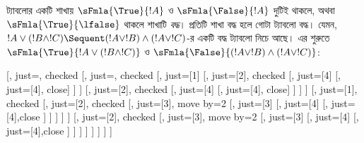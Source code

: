 \documentclass[../../../include/open-logic-section]{subfiles}
\begin{document}
ট্যাবলোর একটি শাখায় $\sFmla{\True}{!A}$ ও
$\sFmla{\False}{!A}$ দুটিই থাকলে, অথবা $\sFmla{\True}{\lfalse}$
থাকলে শাখাটি \emph{বদ্ধ}। প্রতিটি শাখা বদ্ধ হলে গোটা ট্যাবলো
বদ্ধ। যেমন,
$!A \lor (!B \land !C) \Sequent (!A \lor !B) \land
(!A \lor !C)$-র একটি বদ্ধ ট্যাবলো নিচে আছে।
এর শুরুতে $\sFmla{\True}{!A \lor (!B \land
!C)}$ ও $\sFmla{\False}{(!A \lor !B) \land (!A \lor !C)}$:
\begin{maxwidth}
\begin{tableau}{}
  [,
    just=\TAss, checked
    [, just=\TAss, checked
      [, just={\TRule{\True}{\lor}[1]}
        [,
          just={\TRule{\False}{\land}[2]}, checked
          [,
            just={\TRule{\False}{\lor}[4]}
            [,
              just={\TRule{\False}{\lor}[4]}, close]
          ]
        ]
        [,
          just={\TRule{\False}{\land}[2]}, checked
          [,
            just={\TRule{\False}{\lor}[4]}
            [,
              just={\TRule{\False}{\lor}[4]}, close]
          ]
        ]
      ]
      [,
        just={\TRule{\True}{\lor}[1]}, checked
        [,
          just={\TRule{\False}{\land}[2]}, checked
          [,
            just={\TRule{\True}{\land}[3]}, move by=2
            [,
              just={\TRule{\True}{\land}[3]}
              [,
                just={\TRule{\False}{\lor}[4]}
                [,
                  just={\TRule{\False}{\lor}[4]},close
                ]
              ]
            ]
          ]
        ]
        [,
          just={\TRule{\False}{\land}[2]}, checked
          [,
            just={\TRule{\True}{\land}[3]}, move by=2
              [,
                just={\TRule{\True}{\land}[3]}
                [,
                  just={\TRule{\False}{\lor}[4]}
                  [,
                  just={\TRule{\False}{\lor}[4]},close
                ]
              ]
            ]
          ]
        ]
      ]
    ]
  ]
\end{tableau}
\end{maxwidth}
\end{document}
